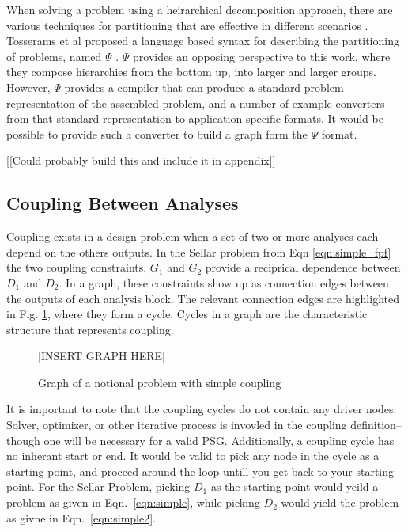   When solving a problem using a heirarchical decomposition approach, 
  there are various techniques for partitioning that are effective in different 
  scenarios \cite{krishnamachari1997optimal,michelena1997hypergraph,
  sobieszczanski1997,Perez2004,allison2009optimal}. Tosserams et al proposed a 
  language based syntax for describing the partitioning of problems, named $\Psi$
  \cite{tosserams2010specification}. $\Psi$ provides an opposing perspective to 
  this work, where they compose hierarchies from the bottom up, into larger and 
  larger groups. However, $\Psi$ provides a compiler that can produce a standard 
  problem representation of the assembled problem, and a number of example converters
  from that standard representation to application specific formats. It would be 
  possible to provide such a converter to build a graph form the $\Psi$ format.

  [[Could probably build this and include it in appendix]] 


\subsection{Coupling Between Analyses}

  Coupling exists in a design problem when a set of two or more analyses each depend on the
  others outputs. In the Sellar problem from Eqn \ref{eqn:simple_fpf} the two 
  coupling constraints, $G_1$ and $G_2$ provide a reciprical dependence between 
  $D_1$ and $D_2$. In a graph, these constraints show up as connection edges between 
  the outputs of each analysis block. The relevant connection edges are highlighted in 
  Fig. \ref{f:coupling}, where they form a cycle. Cycles in a graph are the characteristic 
  structure that represents coupling. 

  \begin{figure}
      \begin{center}
      [INSERT GRAPH HERE]
      \caption{Graph of a notional problem with simple coupling \label{f:coupling}}
      \end{center}
  \end{figure}

	It is important to note that the coupling cycles do not contain 
	any driver nodes. Solver, optimizer, or other iterative process is 
	invovled in the coupling definition--though one will be necessary for a valid 
  PSG. Additionally, a coupling cycle has no inherant start or end. It would be
  valid to pick any node in the cycle as a starting point, and proceed around the
  loop untill you get back to your starting point. For the Sellar Problem, picking 
  $D_1$ as the starting point would yeild a problem as given in 
	Eqn.~\ref{eqn:simple}, while picking $D_2$ would yield the problem as givne in 
  Eqn.~\ref{eqn:simple2}.

